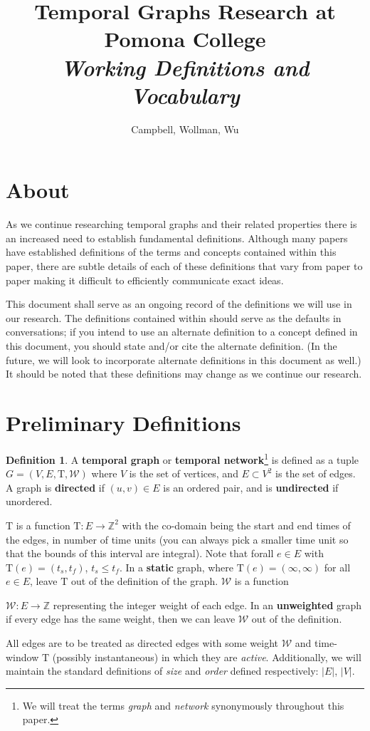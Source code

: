 \documentclass{article}
\title{Temporal Graphs Research at Pomona College\\
  \textit{Working Definitions and Vocabulary}
}
\author{Campbell, Wollman, Wu}
\theoremstyle{definition}
\newtheorem{defn}[thm]{Definition}
\numberwithin{thm}{subsection}
\newcommand{\W}{\mathcal{W}}
\newcommand{\Z}{\mathbb{Z}}
\newcommand{\T}{\text{T}}
\begin{document}
\maketitle

\section{About}

As we continue researching temporal graphs and their related properties there is
an increased need to establish fundamental definitions. Although many papers
have established definitions of the terms and concepts contained within this
paper, there are subtle details of each of these definitions that vary from
paper to paper making it difficult to efficiently communicate exact ideas.

This document shall serve as an ongoing record of the definitions we will use
in our research. The definitions contained within should serve as the defaults
in conversations; if you intend to use an alternate definition to a concept
defined in this document, you should state and/or cite the alternate definition.
(In the future, we will look to incorporate alternate definitions in this
document as well.) It should be noted that these definitions may change as we
continue our research.

\section{Preliminary Definitions}

\begin{defn}
  A \textbf{temporal graph} or \textbf{temporal network}\footnote{We will treat
  the terms \textit{graph} and \textit{network} synonymously throughout this
  paper.} is defined as a tuple $G = (V,E,\T,\W)$ where $V$ is the set of
  vertices, and $E \subset V^2$ is the set of edges. A graph is \textbf{directed}
  if $(u,v) \in E$ is an ordered pair, and is \textbf{undirected} if unordered.

  $\T$ is a function $\T : E \to \Z^2$ with the co-domain being the start and
  end times of the edges, in number of time units (you can always pick a
  smaller time unit so that the bounds of this interval are integral). Note that
  forall $e \in E$ with $\T(e) = (t_s, t_f)$, $t_s \leq t_f$. In a
  \textbf{static} graph, where $\T(e) = (\infty, \infty)$ for all $e \in E$,
  leave $\T$ out of the definition of the graph. $\W$ is a function

  $\W : E \to \Z$ representing the integer weight of each edge. In an
  \textbf{unweighted} graph if every edge has the same weight, then we can
  leave $\W$ out of the definition.

  All edges are to be treated as directed edges with some weight $\W$ and
  time-window $\T$ (possibly instantaneous) in which they are \textit{active}.
  Additionally, we will maintain the standard definitions of \textit{size} and
  \textit{order} defined respectively: $|E|$,  $|V|$.
\end{defn}
\end{document}
